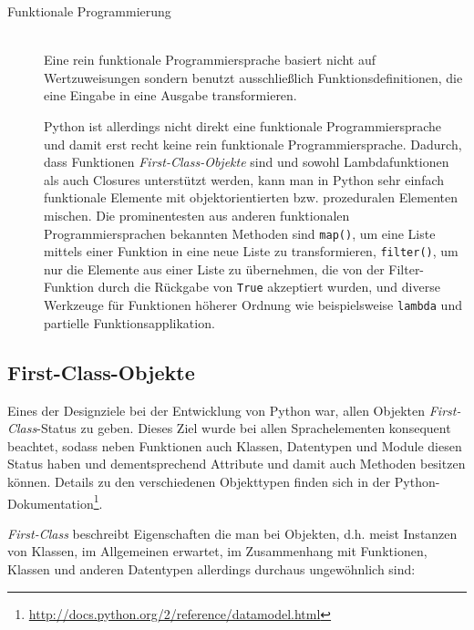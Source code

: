 \begin{description}
\item[Funktionale Programmierung] \hfill \\
Eine rein funktionale Programmiersprache basiert nicht auf Wertzuweisungen sondern benutzt
ausschließlich Funktionsdefinitionen, die eine Eingabe in eine Ausgabe transformieren.
\citep[Kap. 1.3.1]{progsprachen}

Python ist allerdings nicht direkt eine funktionale Programmiersprache und damit erst recht keine
rein funktionale Programmiersprache. Dadurch, dass Funktionen \emph{First-Class-Objekte} sind und
sowohl Lambdafunktionen als auch Closures unterstützt werden, kann man in Python sehr einfach
funktionale Elemente mit objektorientierten bzw. prozeduralen Elementen mischen. Die prominentesten
aus anderen funktionalen Programmiersprachen bekannten Methoden sind \lstinline{map()}, um eine
Liste mittels einer Funktion in eine neue Liste zu transformieren, \lstinline{filter()}, um nur die
Elemente aus einer Liste zu übernehmen, die von der Filter-Funktion durch die Rückgabe von
\lstinline{True} akzeptiert wurden, und diverse Werkzeuge für Funktionen höherer Ordnung wie
beispielsweise \lstinline{lambda} und partielle Funktionsapplikation.
\end{description}



\subsection{First-Class-Objekte}

Eines der Designziele bei der Entwicklung von Python war, allen Objekten \emph{First-Class}-Status
\citep{pyhist:firstclass} zu geben. Dieses Ziel wurde bei allen Sprachelementen konsequent beachtet,
sodass neben Funktionen auch Klassen, Datentypen und Module diesen Status haben und dementsprechend
Attribute und damit auch Methoden besitzen können. Details zu den verschiedenen Objekttypen finden
sich in der Python-Dokumentation\footnote{\href{http://docs.python.org/2/reference/datamodel.html}{http://docs.python.org/2/reference/datamodel.html}}.

\emph{First-Class} beschreibt Eigenschaften die man bei Objekten, d.h. meist Instanzen von Klassen,
im Allgemeinen erwartet, im Zusammenhang mit Funktionen, Klassen und anderen Datentypen allerdings
durchaus ungewöhnlich sind:

